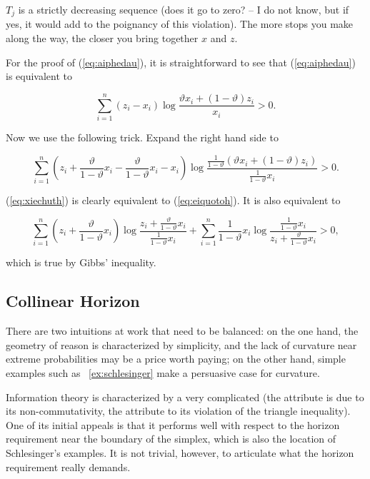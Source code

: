 \documentclass[phd,12pt,oneside]{ubcthesis}
\begin{document}
$T_{j}$ is a strictly decreasing sequence (does it go to zero? -- I do
not know, but if yes, it would add to the poignancy of this
violation). The more stops you make along the way, the closer you
bring together $x$ and $z$.

For the proof of (\ref{eq:aiphedau}), it is straightforward to see
that (\ref{eq:aiphedau}) is equivalent to

\begin{equation}
  \label{eq:eiquotoh}
  \sum_{i=1}^{n}(z_{i}-x_{i})\log\frac{\vartheta{}x_{i}+(1-\vartheta)z_{i}}{x_{i}}>0.
\end{equation}

{\noindent}Now we use the following trick. Expand the right hand side to

\begin{equation}
  \label{eq:xiechuth}
  \sum_{i=1}^{n}\left(z_{i}+\frac{\vartheta}{1-\vartheta}x_{i}-\frac{\vartheta}{1-\vartheta}x_{i}-x_{i}\right)\log\frac{\frac{1}{1-\vartheta}\left(\vartheta{}x_{i}+(1-\vartheta)z_{i}\right)}{\frac{1}{1-\vartheta}x_{i}}>0.
\end{equation}

{\noindent}(\ref{eq:xiechuth}) is clearly equivalent to (\ref{eq:eiquotoh}). It
is also equivalent to

\begin{equation}
  \label{eq:ohrohshi}
  \sum_{i=1}^{n}\left(z_{i}+\frac{\vartheta}{1-\vartheta}x_{i}\right)\log\frac{z_{i}+\frac{\vartheta}{1-\vartheta}x_{i}}{\frac{1}{1-\vartheta}x_{i}}+
  \sum_{i=1}^{n}\frac{1}{1-\vartheta}x_{i}\log\frac{\frac{1}{1-\vartheta}x_{i}}{z_{i}+\frac{\vartheta}{1-\vartheta}x_{i}}>0,
\end{equation}

{\noindent}which is true by Gibbs' inequality.


\subsection{Collinear Horizon}
\label{subsec:colhor}

There are two intuitions at work that need to be balanced: on the one
hand, the geometry of reason is characterized by simplicity, and the
lack of curvature near extreme probabilities may be a price worth
paying; on the other hand, simple examples such as
{\xample}~\ref{ex:schlesinger} make a persuasive case for curvature.

Information theory is characterized by a very complicated
 (the attribute  is due to its
non-commutativity, the attribute  to its violation of the
triangle inequality). One of its initial appeals is that it performs
well with respect to the horizon requirement near the boundary of the
simplex, which is also the location of Schlesinger's examples. It is
not trivial, however, to articulate what the horizon requirement
really demands.
\end{document}
